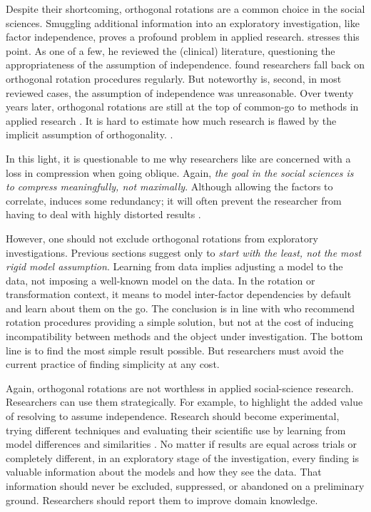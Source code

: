 \documentclass[jou, 11pt]{apa7}
\begin{document}
Despite their shortcoming, orthogonal rotations are a common choice in the
social sciences. Smuggling additional information into an exploratory
investigation, like factor independence, proves a profound problem in applied
research. \textcite{Loo1979} stresses this point. As one of a few, he reviewed
the (clinical) literature, questioning the appropriateness of the assumption of
independence. \textcite{Loo1979} found researchers fall back on orthogonal
rotation procedures regularly. But noteworthy is, second, in most reviewed
cases, the assumption of independence was unreasonable. Over twenty years
later, orthogonal rotations are still at the top of common-go to methods in
applied research \parencite{Ford1986, Costello2005}. It is hard to estimate how
much research is flawed by the implicit assumption of orthogonality.
.

In this light, it is questionable to me why researchers like
\textcite{Bortz2016} are concerned with a loss in compression when going
oblique. Again, \textit{the goal in the social sciences is to compress
meaningfully, not maximally}. Although allowing the factors to correlate,
induces some redundancy; it will often prevent the researcher from having to
deal with highly distorted results \parencite{Sass2010}.

However, one should not exclude orthogonal rotations from exploratory
investigations. Previous sections suggest only to \textit{start with the least,
not the most rigid model assumption}. Learning from data implies adjusting a
model to the data, not imposing a well-known model on the data. In the rotation
or transformation context, it means to model inter-factor dependencies by
default and learn about them on the go. The conclusion is in line with
\textcite{Sass2010, Muthen1984} who recommend rotation procedures providing a
simple solution, but not at the cost of inducing incompatibility between
methods and the object under investigation. The bottom line is to find the most
simple result possible. But researchers must avoid the current practice of
finding simplicity at any cost.

Again, orthogonal rotations are not worthless in applied social-science research.
Researchers can use them strategically. For example, to highlight the added
value of resolving to assume independence. Research should become experimental,
trying different techniques and evaluating their scientific use by learning
from model differences and similarities \parencite[p. 642]{Tabachnick2007}. No
matter if results are equal across trials or completely different, in an
exploratory stage of the investigation, every finding is valuable information
about the models and how they see the data. That information should never be
excluded, suppressed, or abandoned on a preliminary ground. Researchers should
report them to improve domain knowledge.
\end{document}
